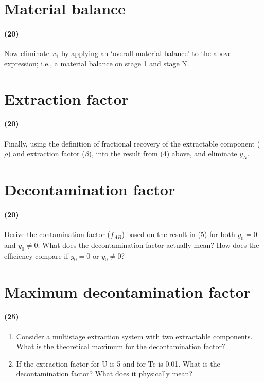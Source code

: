 \documentclass[11pt,a4paper]{article}
\begin{document}
\newpage

\section{Material balance}
\paragraph*{(20)}
Now eliminate $x_1$ by applying an ‘overall material balance’ to the above expression; i.e., a material balance on stage 1 and stage N.





\newpage

\section{Extraction factor}
\paragraph*{(20)}
Finally, using the definition of fractional recovery of the extractable component ($\rho$) and extraction factor ($\beta$), into the result from (4) above, and eliminate $y_N$.





\newpage

\section{Decontamination factor}
\paragraph*{(20)}
Derive the contamination factor ($f_{AB}$) based on the result in (5) for both $y_0 = 0$ and $y_0 \neq 0$. What does the decontamination factor actually mean? How does the efficiency compare if $y_0 = 0$ or $y_0 \neq 0$?





\newpage

\section{Maximum decontamination factor}
\paragraph*{(25)}
\begin{enumerate}[leftmargin=*,topsep=0pt,label=\alph*.]
    \item Consider a multistage extraction system with two extractable components. What is the theoretical maximum for the decontamination factor?
    \item If the extraction factor for U is 5 and for Tc is 0.01. What is the decontamination factor? What does it physically mean?
\end{enumerate}
\end{document}
